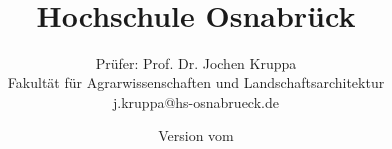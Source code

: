 \def\Rlogo{\texttt{[image: \\string~/Documents/GitHub/exam/img/Rlogo]}\;}

\usepackage[scaled=.90]{helvet} 
\usepackage{fancyhdr}
\usepackage{lastpage}
\usepackage{hyperref}
\hypersetup{
    colorlinks=true,       %
    linkcolor=black,          %
    urlcolor=magenta           %
}
\renewcommand{\familydefault}{\sfdefault}

\title{
\large \exammodule \\[5Ex]
\Huge \examtitle \\[2Ex] 
\Large Hochschule Osnabr{\"u}ck
}
\author{Pr{\"u}fer: Prof. Dr. Jochen Kruppa \\
Fakult{\"a}t f{\"u}r Agrarwissenschaften und Landschaftsarchitektur \\ 
j.kruppa@hs-osnabrueck.de}
\date{Version vom \examdate}

\renewcommand{\headrulewidth}{0pt}
\renewcommand{\footrulewidth}{0pt}
\pagestyle{fancy}

\fancyhf{}
\fancyhead[L]{}
\fancyhead[R]{}
\fancyfoot[R]{\thepage}
\fancyfoot[L]{\footnotesize \examtitle}


\usepackage{arevtext,arevmath}

\newcommand\Tstrut{\rule{0pt}{2.6ex}}         %
\newcommand\Bstrut{\rule[-0.9ex]{0pt}{0pt}}   %
\def\strut{\Tstrut\Bstrut}
